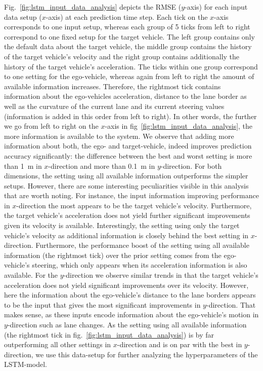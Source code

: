 Fig.~\ref{fig:lstm_input_data_analysis} depicts the \ac{RMSE} ($y$-axis) for each input data setup ($x$-axis) at each prediction time step.
Each tick on the $x$-axis corresponds to one input setup, whereas each group of \num{5} ticks from left to right correspond to one fixed setup for the target vehicle.
The left group contains only the default data about the target vehicle, the middle group contains the history of the target vehicle's velocity and the right group contains additionally the history of the target vehicle's acceleration.
The ticks within one group correspond to one setting for the ego-vehicle, whereas again from left to right the amount of available information increases.
Therefore, the rightmost tick contains information about the ego-vehicles acceleration, distance to the lane border as well as the curvature of the current lane and its current steering values (information is added in this order from left to right). 
In other words, the further we go from left to right on the $x$-axis in fig~\ref{fig:lstm_input_data_analysis}, the more information is available to the system.
We observe that adding more information about both, the ego- and target-vehicle, indeed improves prediction accuracy significantly: the difference between the best and worst setting is more than \SI{1}{\meter} in $x$-direction and more than \SI{0.1}{\meter} in $y$-direction.
For both dimensions, the setting using all available information outperforms the simpler setups.
However, there are some interesting peculiarities visible in this analysis that are worth noting.
For instance, the input information improving performance in $x$-direction the most appears to be the target vehicle's velocity. 
Furthermore, the target vehicle's acceleration does not yield further significant improvements given its velocity is available.
Interestingly, the setting using only the target vehicle's velocity as additional information is closely behind the best setting in $x$-direction.
Furthermore, the performance boost of the setting using all available information (the rightmost tick) over the prior setting comes from the ego-vehicle's steering, which only appears when its acceleration information is also available.
For the $y$-direction we observe similar trends in that the target vehicle's acceleration does not yield significant improvements over its velocity.
However, here the information about the ego-vehicle's distance to the lane borders appears to be the input that gives the most significant improvements in $y$-direction.
That makes sense, as these inputs encode information about the ego-vehicle's motion in $y$-direction such as lane changes.
As the setting using all available information (the rightmost tick in fig.~\ref{fig:lstm_input_data_analysis}) is by far outperforming all other settings in $x$-direction and is on par with the best in $y$-direction, we use this data-setup for further analyzing the hyperparameters of the \ac{LSTM}-model.

